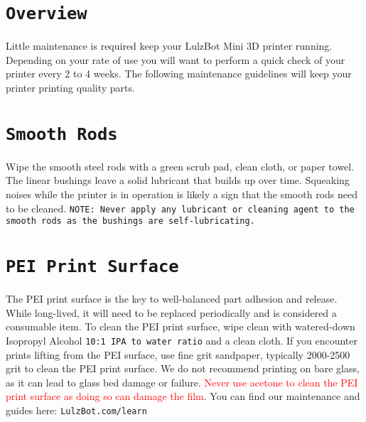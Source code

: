 %
%
%
%
%

\section{\texttt{Overview}}
Little maintenance is required keep your LulzBot\textsuperscript{\miniscule{\textregistered}} Mini 3D printer running. Depending on your rate of use you will want to perform a quick check of your printer every 2 to 4 weeks. The following maintenance guidelines will keep your printer printing quality parts.

\section{\texttt{Smooth Rods}}
Wipe the smooth steel rods with a green scrub pad, clean cloth, or paper towel. The linear bushings leave a solid lubricant that builds up over time. Squeaking noises while the printer is in operation is likely a sign that the smooth rods need to be cleaned. \texttt{NOTE: Never apply any lubricant or cleaning agent to the smooth rods as the bushings are self-lubricating.}


\section{\texttt{PEI Print Surface}}
The PEI print surface is the key to well-balanced part adhesion and release. While long-lived, it will need to be replaced periodically and is considered a consumable item. To clean the PEI print surface, wipe clean with watered-down Isopropyl Alcohol \texttt{10:1 IPA to water ratio} and a clean cloth. If you encounter prints lifting from the PEI surface, use fine grit sandpaper, typically 2000-2500 grit to clean the PEI print surface. We do not recommend printing on bare glass, as it can lead to glass bed damage or failure. \textcolor{red}{Never use acetone to clean the PEI print surface as doing so can damage the film}. You can find our maintenance and guides here:
\texttt{LulzBot.com/learn}

